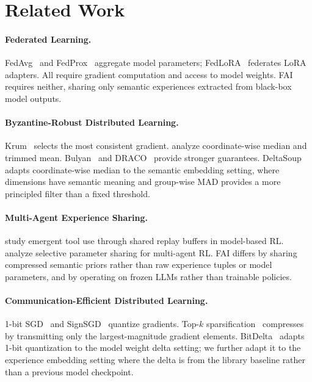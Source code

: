 \section{Related Work}

\label{sec:related}

\paragraph{Federated Learning.}
FedAvg~\cite{mcmahan2017communication} and FedProx~\cite{li2020federated}
aggregate model parameters; FedLoRA~\cite{zhang2024fedlora} federates LoRA
adapters. All require gradient computation and access to model weights. FAI
requires neither, sharing only semantic experiences extracted from black-box
model outputs.

\paragraph{Byzantine-Robust Distributed Learning.}
Krum~\cite{blanchard2017machine} selects the most consistent gradient.
\cite{yin2018byzantine} analyze coordinate-wise median and trimmed mean.
Bulyan~\cite{mhamdi2018hidden} and DRACO~\cite{chen2018draco} provide
stronger guarantees. DeltaSoup adapts coordinate-wise median to the
semantic embedding setting, where dimensions have semantic meaning and
group-wise MAD provides a more principled filter than a fixed threshold.

\paragraph{Multi-Agent Experience Sharing.}
\cite{baker2020emergent} study emergent tool use through shared replay
buffers in model-based RL. \cite{christianos2021scaling} analyze selective
parameter sharing for multi-agent RL. FAI differs by sharing compressed
semantic priors rather than raw experience tuples or model parameters, and
by operating on frozen LLMs rather than trainable policies.

\paragraph{Communication-Efficient Distributed Learning.}
1-bit SGD~\cite{seide20141bit} and SignSGD~\cite{bernstein2018signsgd}
quantize gradients. Top-$k$ sparsification~\cite{stich2018sparsified}
compresses by transmitting only the largest-magnitude gradient elements.
BitDelta~\cite{hanzo2026bitdelta} adapts 1-bit quantization to the model
weight delta setting; we further adapt it to the experience embedding setting
where the delta is from the library baseline rather than a previous model
checkpoint.

